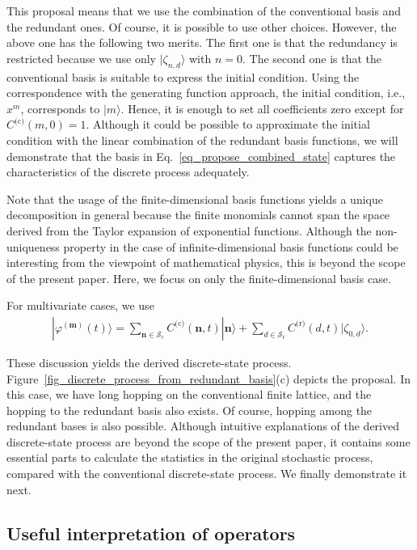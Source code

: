 \documentclass[sn-mathphys,Numbered]{sn-jnl}%
\theoremstyle{thmstyleone}%
\theoremstyle{thmstyletwo}%
\theoremstyle{thmstylethree}%
\begin{document}
This proposal means that we use the combination of the conventional basis and the redundant ones. Of course, it is possible to use other choices. However, the above one has the following two merits. The first one is that the redundancy is restricted because we use only $| \zeta_{n,d} \rangle$ with $n=0$. The second one is that the conventional basis is suitable to express the initial condition. Using the correspondence with the generating function approach, the initial condition, i.e., $x^m$, corresponds to $|m\rangle$. Hence, it is enough to set all coefficients zero except for $C^{\textrm{(c)}}(m,0) = 1$. Although it could be possible to approximate the initial condition with the linear combination of the redundant basis functions, we will demonstrate that the basis in Eq.~\eqref{eq_propose_combined_state} captures the characteristics of the discrete process adequately. 


Note that the usage of the finite-dimensional basis functions yields a unique decomposition in general because the finite monomials cannot span the space derived from the Taylor expansion of exponential functions. Although the non-uniqueness property in the case of infinite-dimensional basis functions could be interesting from the viewpoint of mathematical physics, this is beyond the scope of the present paper. Here, we focus on only the finite-dimensional basis case.


For multivariate cases, we use 
\begin{align}
|\varphi^{(\bm{m})}(t)\rangle 
= \sum_{\bm{n} \in \mathcal{S}_{\textrm{c}}} C^{\textrm{(c)}}(\bm{n},t) | \bm{n} \rangle
+ \sum_{d\in \mathcal{S}_{\textrm{r}}}  C^{\textrm{(r)}}(d,t) | \zeta_{0,d} \rangle.
\end{align}

These discussion yields the derived discrete-state process. Figure~\ref{fig_discrete_process_from_redundant_basis}(c) depicts the proposal. In this case, we have long hopping on the conventional finite lattice, and the hopping to the redundant basis also exists. Of course, hopping among the redundant bases is also possible. Although intuitive explanations of the derived discrete-state process are beyond the scope of the present paper, it contains some essential parts to calculate the statistics in the original stochastic process, compared with the conventional discrete-state process. We finally demonstrate it next.
 

\subsection{Useful interpretation of operators}
\label{subsec_application}
\end{document}
